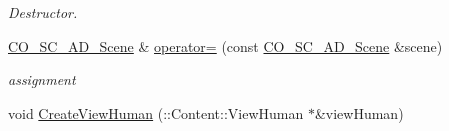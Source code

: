 \begin{DoxyCompactItemize}
\begin{DoxyCompactList}\small\item\em Destructor. \item\end{DoxyCompactList}\item 
\hypertarget{classContent_1_1CO__SC__AD__Scene_a54c4b1cada3763ddb3bbae8c94e5fb14}{
\hyperlink{classContent_1_1CO__SC__AD__Scene}{CO\_\-SC\_\-AD\_\-Scene} \& \hyperlink{classContent_1_1CO__SC__AD__Scene_a54c4b1cada3763ddb3bbae8c94e5fb14}{operator=} (const \hyperlink{classContent_1_1CO__SC__AD__Scene}{CO\_\-SC\_\-AD\_\-Scene} \&scene)}
\label{classContent_1_1CO__SC__AD__Scene_a54c4b1cada3763ddb3bbae8c94e5fb14}

\begin{DoxyCompactList}\small\item\em assignment \item\end{DoxyCompactList}\item 
void \hyperlink{classContent_1_1CO__SC__AD__Scene_a62929f0e59b9b4617c2caa3079991300}{CreateViewHuman} (::Content::ViewHuman $\ast$\&viewHuman)
\end{DoxyCompactItemize}
